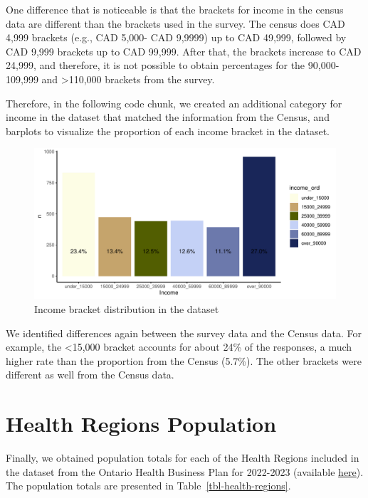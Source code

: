 \documentclass[
  letterpaper,
  DIV=11,
  numbers=noendperiod]{scrartcl}
\begin{document}
One difference that is noticeable is that the brackets for income in the
census data are different than the brackets used in the survey. The
census does CAD 4,999 brackets (e.g., CAD 5,000- CAD 9,9999) up to CAD
49,999, followed by CAD 9,999 brackets up to CAD 99,999. After that, the
brackets increase to CAD 24,999, and therefore, it is not possible to
obtain percentages for the 90,000-109,999 and \textgreater110,000
brackets from the survey.

Therefore, in the following code chunk, we created an additional
category for income in the dataset that matched the information from the
Census, and barplots to visualize the proportion of each income bracket
in the dataset.

\begin{figure}

{\centering \includegraphics{appendix_files/figure-pdf/income-1.pdf}

}

\caption{Income bracket distribution in the dataset}

\end{figure}

We identified differences again between the survey data and the Census
data. For example, the \textless15,000 bracket accounts for about 24\%
of the responses, a much higher rate than the proportion from the Census
(5.7\%). The other brackets were different as well from the Census data.

\hypertarget{health-regions-population}{%
\section{Health Regions Population}\label{health-regions-population}}

Finally, we obtained population totals for each of the Health Regions
included in the dataset from the Ontario Health Business Plan for
2022-2023 (available
\href{https://www.ontariohealth.ca/sites/ontariohealth/files/2022-05/OHBusinessPlan22_23.pdf}{here}).
The population totals are presented in Table~\ref{tbl-health-regions}.
\end{document}
